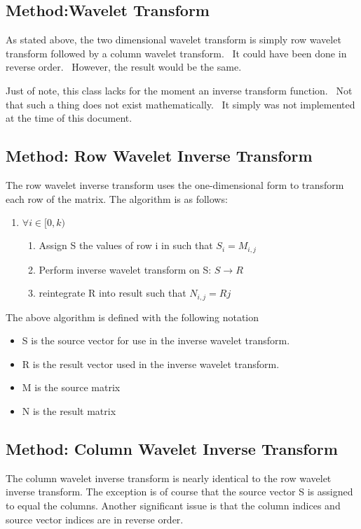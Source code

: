 \subsection{Method:Wavelet Transform}

\bigskip As stated above, the two dimensional wavelet transform is simply
row wavelet transform followed by a column wavelet transform. \ It could
have been done in reverse order. \ However, the result would be the same. \ 

Just of note, this class lacks for the moment an inverse transform function.
\ Not that such a thing does not exist mathematically. \ It simply was not
implemented at the time of this document. \ 

\subsection {Method: Row Wavelet Inverse Transform}
\bigskip The row wavelet inverse transform uses the one-dimensional form to transform each row of the matrix.  The algorithm is as follows:

\begin{enumerate}
\item $\forall i \in [0,k)$
\begin{enumerate}
	\item Assign S the values of row i in such that $S_i = M_{i,j}$
	\item Perform inverse wavelet transform on S:  $S\rightarrow R$
	\item reintegrate R into result such that $N_{i,j} = R{j} $
\end{enumerate}
\end{enumerate}

The above algorithm is defined with the following notation
	\begin{itemize}
	\item S is the source vector for use in the inverse wavelet transform.
	\item R is the result vector used in the inverse wavelet transform.
	\item M is the source matrix
	\item N is the result matrix
	\end{itemize}

\bigskip

\subsection {Method: Column Wavelet Inverse Transform}
The column wavelet inverse transform is nearly identical to the row wavelet inverse transform.  The exception is of course that the source vector S is assigned to equal the columns.  Another significant issue is that the column indices and source vector indices are in reverse order.

